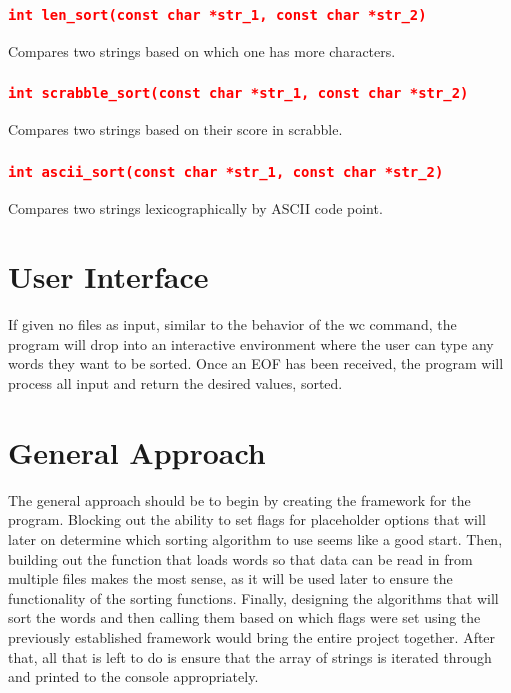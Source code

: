 \documentclass[11pt]{report}
\begin{document}
\subsubsection*{\texttt{\textcolor{red}{int len\_sort(const char *str\_1, const char *str\_2)}}}
Compares two strings based on which one has more characters.
\subsubsection*{\texttt{\textcolor{red}{int scrabble\_sort(const char *str\_1, const char *str\_2)}}}
Compares two strings based on their score in scrabble.
\subsubsection*{\texttt{\textcolor{red}{int ascii\_sort(const char *str\_1, const char *str\_2)}}}
Compares two strings lexicographically by ASCII code point.
\pagebreak
\section*{User Interface}
If given no files as input, similar to the behavior of the wc command, the program will drop into an interactive environment where the user can type any words they want to be sorted. Once an EOF has been received, the program will process all input and return the desired values, sorted.
\section*{General Approach}
The general approach should be to begin by creating the framework for the program. Blocking out the ability to set flags for placeholder options that will later on determine which sorting algorithm to use seems like a good start. Then, building out the function that loads words so that data can be read in from multiple files makes the most sense, as it will be used later to ensure the functionality of the sorting functions. Finally, designing the algorithms that will sort the words and then calling them based on which flags were set using the previously established framework would bring the entire project together. After that, all that is left to do is ensure that the array of strings is iterated through and printed to the console appropriately.
\end{document}
